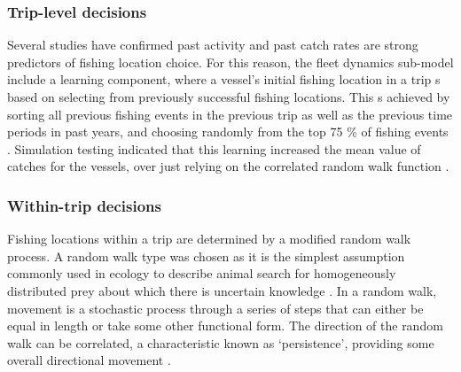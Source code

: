 \documentclass[review]{elsarticle}
\begin{document}
\subsubsection{Trip-level decisions}

Several studies \citep[e.g.][]{Hutton2004, Tidd2012, Girardin2015} have
confirmed past activity and past catch rates are strong predictors of fishing
location choice. For this reason, the fleet dynamics sub-model
include a learning component, where a vessel's initial
fishing location in a trip s based on selecting from
previously successful fishing locations. This s achieved
by sorting all previous fishing events in the previous trip as well as the
previous time periods in past years, and choosing randomly from the top 75 \%
of fishing events .
Simulation testing indicated that this learning increased the mean value of
catches for the vessels, over just relying on the correlated random
walk  function
. 

\subsubsection{Within-trip decisions}

Fishing locations within a trip are determined by a modified random walk
process. A random walk type was chosen as it is the simplest assumption
commonly used in ecology to describe  animal
 search for
 homogeneously distributed prey about which there is
uncertain knowledge \citep{Viswanathan1999}. In a random walk, movement is a
stochastic process through a series of steps that can either be equal in length or take
some other functional form. The direction of the random walk can be correlated,
a characteristic known as `persistence', providing some overall
 directional movement \citep{Codling2008}
. \\
\end{document}
